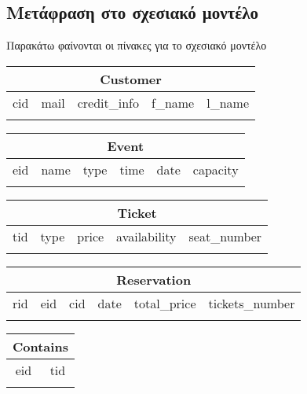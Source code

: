 \documentclass{article}
\begin{document}
\subsection*{Μετάφραση στο σχεσιακό μοντέλο}
Παρακάτω φαίνονται οι πίνακες για το σχεσιακό μοντέλο\\
\noindent
\begin{tabular}{|c|c|c|c|c|}
\hline
\multicolumn{5}{|c|}{Customer} \\
\hline
cid & mail & credit\_info & f\_name & l\_name \\
\hline
& & & & \\
\hline
\end{tabular}

\vspace{10pt}

\noindent
\begin{tabular}{|c|c|c|c|c|c|}
\hline
\multicolumn{6}{|c|}{Event} \\
\hline
eid & name & type & time & date & capacity \\
\hline
& & & & & \\
\hline
\end{tabular}

\vspace{10pt}

\noindent
\begin{tabular}{|c|c|c|c|c|}
\hline
\multicolumn{5}{|c|}{Ticket} \\
\hline
tid & type & price & availability & seat\_number \\
\hline
& & & & \\
\hline
\end{tabular}

\vspace{10pt}

\noindent
\begin{tabular}{|c|c|c|c|c|c|}
\hline
\multicolumn{6}{|c|}{Reservation} \\
\hline
rid & eid & cid & date & total\_price & tickets\_number \\
\hline
& & & & & \\
\hline
\end{tabular}

\vspace{10pt}


\noindent
\begin{tabular}{|c|c|}
\hline
\multicolumn{2}{|c|}{Contains} \\
\hline
eid & tid \\
\hline
& \\
\hline
\end{tabular}
\end{document}

